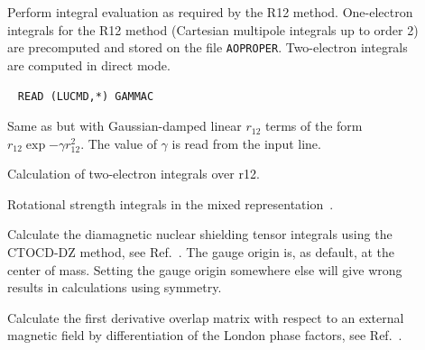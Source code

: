 \begin{description}
\item[] Perform integral evaluation as required by the R12 method.
One-electron integrals for the R12 method (Cartesian multipole integrals up to order 2)
are precomputed and stored on the file \texttt{AOPROPER}. Two-electron integrals are
computed in direct mode.

\item[]\verb| |\newline
\verb|READ (LUCMD,*) GAMMAC|

Same as  but with Gaussian-damped linear $r_{12}$ terms of
the form $r_{12}\exp{-\gamma r_{12}^2}$. The value of $\gamma$ is read from the input line.

\item[] Calculation of two-electron integrals over r12.

\item[] Rotational strength integrals in the mixed
representation~\cite{tbphkkrjcp110}.


\item[] Calculate the diamagnetic nuclear shielding tensor 
integrals using the CTOCD-DZ method,
see Ref.~\cite{paololazz1,paololazz2,ctocd}. 
The gauge origin is, as default, at the center of mass. 
Setting the gauge origin somewhere else will give wrong results in calculations using symmetry.



\item[] Calculate the first derivative overlap
matrix with respect to an
external magnetic field by differentiation
of the London phase factors, see Ref.~\cite{thpjjcp95}.


\end{description}
